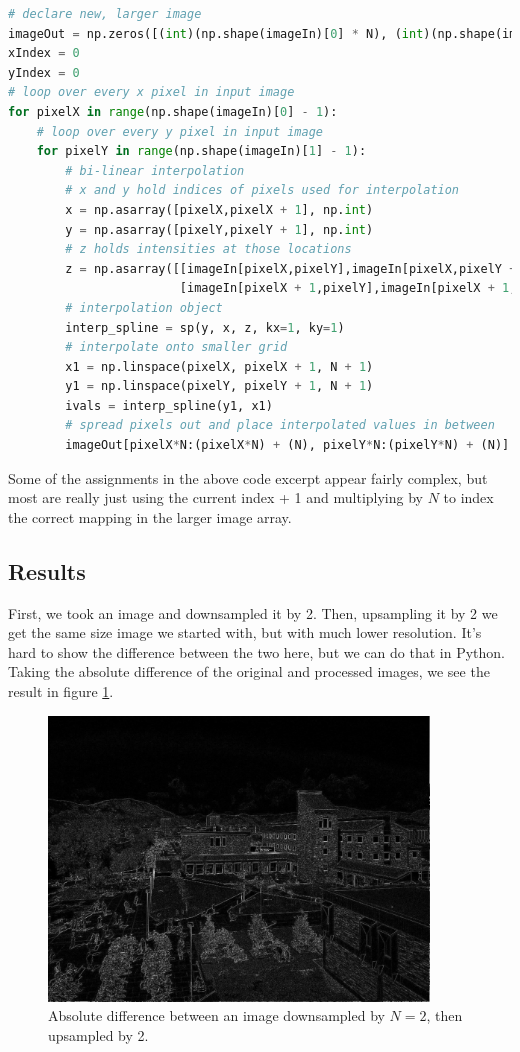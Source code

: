 \documentclass[11pt,a4paper]{article}
\begin{document}
\begin{lstlisting}[language=Python]
# declare new, larger image
imageOut = np.zeros([(int)(np.shape(imageIn)[0] * N), (int)(np.shape(imageIn)[1] * N)])
xIndex = 0
yIndex = 0
# loop over every x pixel in input image
for pixelX in range(np.shape(imageIn)[0] - 1):
    # loop over every y pixel in input image
    for pixelY in range(np.shape(imageIn)[1] - 1):
        # bi-linear interpolation
        # x and y hold indices of pixels used for interpolation
        x = np.asarray([pixelX,pixelX + 1], np.int)
        y = np.asarray([pixelY,pixelY + 1], np.int)
        # z holds intensities at those locations
        z = np.asarray([[imageIn[pixelX,pixelY],imageIn[pixelX,pixelY + 1]],
                        [imageIn[pixelX + 1,pixelY],imageIn[pixelX + 1,pixelY + 1]]], np.float)
        # interpolation object
        interp_spline = sp(y, x, z, kx=1, ky=1)
        # interpolate onto smaller grid
        x1 = np.linspace(pixelX, pixelX + 1, N + 1)
        y1 = np.linspace(pixelY, pixelY + 1, N + 1)
        ivals = interp_spline(y1, x1)
        # spread pixels out and place interpolated values in between
        imageOut[pixelX*N:(pixelX*N) + (N), pixelY*N:(pixelY*N) + (N)] = ivals[0:N,0:N]
\end{lstlisting}

Some of the assignments in the above code excerpt appear fairly complex, but most are really just using the current index + 1 and multiplying by $N$ to index the correct mapping in the larger image array.

\subsection{Results}
First, we took an image and downsampled it by 2. Then, upsampling it by 2 we get the same size image we started with, but with much lower resolution. It's hard to show the difference between the two here, but we can do that in Python. Taking the absolute difference of the original and processed images, we see the result in figure \ref{fig:downup2}.

\pagebreak

\begin{figure}[ht]
	\centering
	\includegraphics[width=0.9\textwidth]{figs/test01_downUp2_diff2}
	\caption{Absolute difference between an image downsampled by $N=2$, then upsampled by 2.}
	\label{fig:downup2}
\end{figure}
\end{document}

